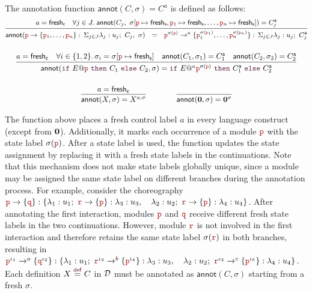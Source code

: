 \begin{defi}[Annotation]\label{def:annot}
  The annotation function $\mathsf{annot}(C,\sigma)=C^a$ is defined as
  follows:\\
  \[
    \begin{array}{@{}c@{}}\small
      \infer
      {
      \mathsf{annot}\!\left(
      \interact{\nr}{\nr_1,\ldots,\nr_n},\ \sigma
      \right)
      \ \ =\ \
      \interactl{\nr^{\sigma(\nr)}}a{\nr_1^{\sigma(\nr_1)},\ldots,\nr_n^{\sigma(\nr_n)}}
      }
      {
      a=\mathsf{fresh}_{\mathsf c}
      \quad
      \forall j\in J.\ \mathsf{annot}(C_j,\ \sigma[
      \nr\mapsto\mathsf{fresh}_{\mathsf s},
      \nr_1\mapsto\mathsf{fresh}_{\mathsf s},\ldots,
      \nr_n\mapsto\mathsf{fresh}_{\mathsf s}])=\anno {C}_j
      }
      \\[6mm]
      \infer
      {
      \mathsf{annot}(\ifTE{E}{\nr}{C_1}{C_2},\sigma)
      =
      \ifTEl{E}a{\nr^{\sigma(\nr)}}{\anno {C}_1}{\anno C_2}
      }
      {
      a=\mathsf{fresh}_{\mathsf c}
      \quad
      \forall i\in\{1,2\}.\,\sigma_i=\sigma[\nr\mapsto\mathsf{fresh}_{\mathsf s}]
      \quad
      \mathsf{annot}(C_1,\sigma_1)=\anno C_1
      \quad
      \mathsf{annot}(C_2,\sigma_2)=\anno C_2
      }
      \\[6mm]
      \infer
      {
      \mathsf{annot}(X,\sigma)=X^{a,\sigma}
      }
      {
      a=\mathsf{fresh}_{\mathsf c}
      }
      \qquad\qquad
      \infer
      {
      \mathsf{annot}(\CEnd,\sigma)=\CEnd^{\sigma}
      }
      {
      }
\end{array}
\]
\end{defi}
The function above places a fresh control label $a$ in every language
construct (except from $\mathbf{0}$). Additionally, it marks each
occurrence of a module $\nr$ with the state label $\sigma(\nr)$. After
a state label is used, the function updates the state assignment by
replacing it with a fresh state labels in the continuations. Note that
this mechanism does not make state labels globally unique, since a
module may be assigned the same state label on different branches
during the annotation process.
For example, consider the choreography
$
\interactBase{\nr}{\nrr} :
\{\lambda_1:u_1;\ \interactBase{\nrrr}{\nr}: \lambda_3:u_3,\quad
\lambda_2:u_2;\ \interactBase{\nrrr}{\nr}: \lambda_4:u_4\}
$.
After annotating the first interaction, modules $\nr$ and $\nrr$
receive different fresh state labels in the two
continuations. However, module $\nrrr$ is not involved in the first
interaction and therefore retains the same state label $\sigma(\nrrr)$
in both branches, resulting in
$
\interactBasel{\nr^{\iota_1}}a{\nrr^{\iota_2}} :
\{\lambda_1:u_1;\ \interactBasel{\nrrr^{\iota_3}}b{\nr^{\iota_4}}: \lambda_3:u_3,\quad
\lambda_2:u_2;\ \interactBasel{\nrrr^{\iota_3}}c{\nr^{\iota_5}}: \lambda_4:u_4\}
$.
Each definition
$X\stackrel{\textcolor{sh_keyword}{\mathsf{def}}}{=} C$ in $\mathcal D$
must be annotated as $\mathsf{annot}(C, \sigma)$ starting from a fresh
$\sigma$.



